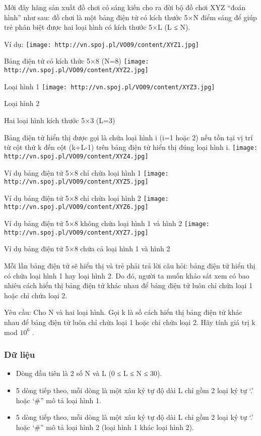 



   Mới đây hãng sản xuất đồ chơi có sáng kiến cho ra đời bộ đồ chơi XYZ “đoán hình” như sau: đồ chơi là một bảng điện tử có kích thước 5×N điểm sáng để giúp trẻ phân biệt được hai loại hình có kích thước 5×L (L ≤ N).  

   Ví dụ:  
\texttt{[image: http://vn.spoj.pl/VO09/content/XYZ1.jpg]}

               Bảng điện tử có kích thức 5×8 (N=8)             
\texttt{[image: http://vn.spoj.pl/VO09/content/XYZ2.jpg]}

                       Loại hình 1                     
\texttt{[image: http://vn.spoj.pl/VO09/content/XYZ3.jpg]}

                       Loại hình 2                     

                       Hai loại hình kích thước 5×3 (L=3)                     

   Bảng điện tử hiển thị được gọi là chứa loại hình i (i=1 hoặc 2) nếu tồn tại vị trí từ cột thứ k đến cột (k+L-1) trên bảng điện tử hiển thị đúng loại hình i.  
\texttt{[image: http://vn.spoj.pl/VO09/content/XYZ4.jpg]}

               Ví dụ bảng điện tử 5×8 chỉ chứa loại hình 1             
\texttt{[image: http://vn.spoj.pl/VO09/content/XYZ5.jpg]}

               Ví dụ bảng điện tử 5×8 chỉ chứa loại hình 2             
\texttt{[image: http://vn.spoj.pl/VO09/content/XYZ6.jpg]}

               Ví dụ bảng điện tử 5×8  không chứa loại hình 1 và hình 2             
\texttt{[image: http://vn.spoj.pl/VO09/content/XYZ7.jpg]}

               Ví dụ bảng điện tử 5×8  chứa cả loại hình 1 và hình 2             

   Mỗi lần bảng điện tử sẽ hiển thị và trẻ phải trả lời câu hỏi: bảng điện tử hiển thị có chứa loại hình 1 hay loại hình 2. Do đó, người ta muốn khảo sát xem có bao nhiêu cách hiển thị bảng điện tử khác nhau để bảng điện tử luôn chỉ chứa loại 1 hoặc chỉ chứa loại 2.  

   Yêu cầu: Cho N và hai loại hình. Gọi k là số cách hiển thị bảng điện tử khác nhau để bảng điện tử luôn chỉ chứa loại 1 hoặc chỉ chứa loại 2. Hãy tính giá trị k  mod $10^{6}$   .  

\subsubsection{   Dữ liệu  }
\begin{itemize}
	\item     Dòng đầu tiên là 2 số N và L (0 ≤ L ≤ N ≤ 30).   
	\item     5 dòng tiếp theo, mỗi dòng là một xâu ký tự độ dài L chỉ gồm 2 loại ký tự ‘.’ hoặc ‘\#” mô tả loại hình 1.   
	\item     5 dòng tiếp theo, mỗi dòng là một xâu ký tự độ dài L chỉ gồm 2 loại ký tự ‘.’ hoặc ‘\#” mô tả loại hình 2 (loại hình 1 khác loại hình 2).   
\end{itemize}

